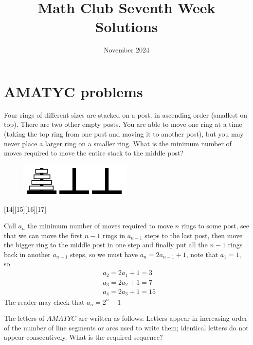 \documentclass[12pt]{article}
\title{Math Club Seventh Week Solutions}
\date{November 2024}
\newcounter{problem}
\begin{document}
\sloppy
\thispagestyle{fancy}

\section*{AMATYC problems}

\begin{problem}
   Four rings of different sizes are stacked on a post, in ascending order (smallest on top). There are two other empty posts. You are able to move one ring at a time (taking the top ring from one post and moving it to another post), but you may never place a larger ring on a smaller ring. What is the minimum number of moves required to move the entire stack to the middle post?
   \vspace{-1em}
\begin{figure}[h]
  \centering
  \includegraphics[width=0.5\textwidth]{piles.png}
\end{figure}
\vskip -3mm
[14][15][16][17]  
\end{problem}

\begin{solution}[C]
      Call $a_n$ the minimum number of moves required to move $n$ rings to some post, see that we can move the first $n-1$ rings in $a_{n-1}$ steps to the last post, then move the bigger ring to the middle post in one step and finally put all the $n-1$ rings back in another $a_{n-1}$ steps, so we must have $a_n=2a_{n-1}+1$, note that $a_1=1$, so
      \begin{align*}
         &a_2 = 2a_1+1=3\\
         &a_3 = 2a_2+1=7\\
         &a_4 = 2a_3+1=\boxed{15}
      \end{align*}
      The reader may check that $a_n=2^n-1$
\end{solution}

\begin{problem}
   The letters of $AMATYC$ are written as follows: Letters appear in increasing order of the number of line segments or arcs used to write them; identical letters do not appear consecutively. What is the required sequence?
\end{problem}
\end{document}
